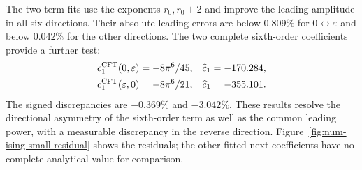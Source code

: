 \documentclass[11pt]{article}
\begin{document}
The two-term fits use the exponents $r_0,r_0+2$ and improve the
leading amplitude in all six directions. Their absolute leading
errors are below $0.809\%$ for $0\leftrightarrow\varepsilon$
and below $0.042\%$ for the other directions.
The two complete sixth-order coefficients provide a further test:
\begin{align}
 c_1^{\rm CFT}(0,\varepsilon)&=-8\pi^6/45,
 &\widehat c_1&=-170.284,\nonumber\\
 c_1^{\rm CFT}(\varepsilon,0)&=-8\pi^6/21,
 &\widehat c_1&=-355.101.
 \label{eq:num-ising-second}
\end{align}
The signed discrepancies are $-0.369\%$ and $-3.042\%$.
These results resolve the directional asymmetry of the sixth-order
term as well as the common leading power, with a measurable
discrepancy in the reverse direction.
Figure~\ref{fig:num-ising-small-residual} shows the residuals;
the other fitted next coefficients have no complete analytical
value for comparison.
\end{document}
